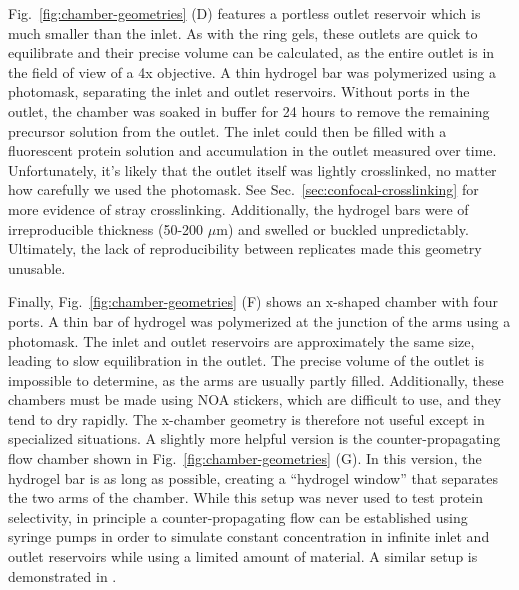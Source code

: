Fig.~\ref{fig:chamber-geometries} (D) features a portless outlet reservoir which is much smaller than the inlet.  As with the ring gels, these outlets are quick to equilibrate and their precise volume can be calculated, as the entire outlet is in the field of view of a 4x objective.  A thin hydrogel bar was polymerized using a photomask, separating the inlet and outlet reservoirs.  Without ports in the outlet, the chamber was soaked in buffer for 24 hours to remove the remaining precursor solution from the outlet.  The inlet could then be filled with a fluorescent protein solution and accumulation in the outlet measured over time.  Unfortunately, it's likely that the outlet itself was lightly crosslinked, no matter how carefully we used the photomask.  See Sec.~\ref{sec:confocal-crosslinking} for more evidence of stray crosslinking.  Additionally, the hydrogel bars were of irreproducible thickness (50-200 $\mu$m) and swelled or buckled unpredictably.  Ultimately, the lack of reproducibility between replicates made this geometry unusable.

Finally, Fig.~\ref{fig:chamber-geometries} (F) shows an x-shaped chamber with four ports.  A thin bar of hydrogel was polymerized at the junction of the arms using a photomask.  The inlet and outlet reservoirs are approximately the same size, leading to slow equilibration in the outlet.  The precise volume of the outlet is impossible to determine, as the arms are usually partly filled.  Additionally, these chambers must be made using NOA stickers, which are difficult to use, and they tend to dry rapidly.  The x-chamber geometry is therefore not useful except in specialized situations.  A slightly more helpful version is the counter-propagating flow chamber shown in Fig.~\ref{fig:chamber-geometries} (G).  In this version, the hydrogel bar is as long as possible, creating a ``hydrogel window'' that separates the two arms of the chamber.  While this setup was never used to test protein selectivity, in principle a counter-propagating flow can be established using syringe pumps in order to simulate constant concentration in infinite inlet and outlet reservoirs while using a limited amount of material. A similar setup is demonstrated in \cite{paustian13}.

